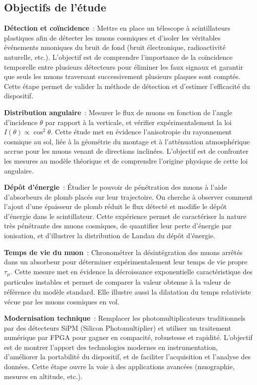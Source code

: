 \documentclass[a4paper,12pt,twoside]{article}
\begin{document}
\subsection{Objectifs de l’étude}

\textbf{Détection et coïncidence}~: Mettre en place un télescope à scintillateurs plastiques afin de détecter les muons cosmiques et d’isoler les véritables événements muoniques du bruit de fond (bruit électronique, radioactivité naturelle, etc.). L’objectif est de comprendre l’importance de la coïncidence temporelle entre plusieurs détecteurs pour éliminer les faux signaux et garantir que seuls les muons traversant successivement plusieurs plaques sont comptés. Cette étape permet de valider la méthode de détection et d’estimer l’efficacité du dispositif.

\textbf{Distribution angulaire}~: Mesurer le flux de muons en fonction de l’angle d’incidence $\theta$ par rapport à la verticale, et vérifier expérimentalement la loi $I(\theta)\propto\cos^2\!\theta$. Cette étude met en évidence l’anisotropie du rayonnement cosmique au sol, liée à la géométrie du montage et à l’atténuation atmosphérique accrue pour les muons venant de directions inclinées. L’objectif est de confronter les mesures au modèle théorique et de comprendre l’origine physique de cette loi angulaire.

\textbf{Dépôt d’énergie}~: Étudier le pouvoir de pénétration des muons à l’aide d’absorbeurs de plomb placés sur leur trajectoire. On cherche à observer comment l’ajout d’une épaisseur de plomb réduit le flux détecté et modifie le dépôt d’énergie dans le scintillateur. Cette expérience permet de caractériser la nature très pénétrante des muons cosmiques, de quantifier leur perte d’énergie par ionisation, et d’illustrer la distribution de Landau du dépôt d’énergie.

\textbf{Temps de vie du muon}~: Chronométrer la désintégration des muons arrêtés dans un absorbeur pour déterminer expérimentalement leur temps de vie propre $\tau_\mu$. Cette mesure met en évidence la décroissance exponentielle caractéristique des particules instables et permet de comparer la valeur obtenue à la valeur de référence du modèle standard. Elle illustre aussi la dilatation du temps relativiste vécue par les muons cosmiques en vol.

\textbf{Modernisation technique}~: Remplacer les photomultiplicateurs traditionnels par des détecteurs SiPM (Silicon Photomultiplier) et utiliser un traitement numérique par FPGA pour gagner en compacité, robustesse et rapidité. L’objectif est de montrer l’apport des technologies modernes en instrumentation, d’améliorer la portabilité du dispositif, et de faciliter l’acquisition et l’analyse des données. Cette étape ouvre la voie à des applications avancées (muographie, mesures en altitude, etc.).
\end{document}
